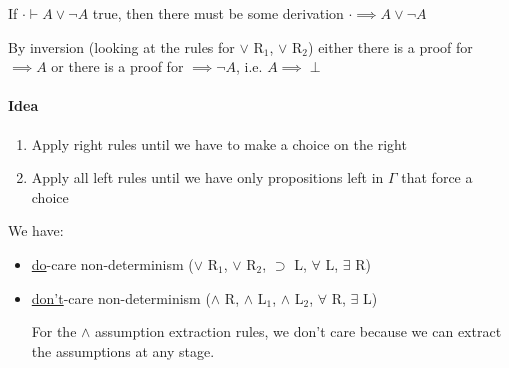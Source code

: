\documentclass[12 pt]{article}
\begin{document}
	If $\cdot \vdash A \lor \neg A$ true, then there must be some
	derivation $\cdot \implies A \lor \neg A$

	By inversion (looking at the rules for $\lor$ R$_1$, $\lor$
	R$_2$) either there is a proof for $\implies A$ or there is a
	proof for $\implies \neg A$, i.e. $A \implies \perp$
	\paragraph{Idea}
	\begin{enumerate}
		\item Apply right rules until we have to make a choice on the
		      right
		\item Apply all left rules until we have only propositions
		      left in $\Gamma$ that force a choice
	\end{enumerate}
	We have:
	\begin{itemize}
		\item
		      \underline{do}-care non-determinism ($\lor$ R$_1$, $\lor$
		      R$_2$, $\supset$ L, $\forall$ L, $\exists$ R)
		\item
		      \underline{don't}-care non-determinism ($\land $ R, $\land$
		      L$_1$, $\land$ L$_2$, $\forall$ R, $\exists$ L)

		      For the $\land$ assumption extraction rules, we don't care
		      because we can extract the assumptions at any stage.
	\end{itemize}
\end{document}
